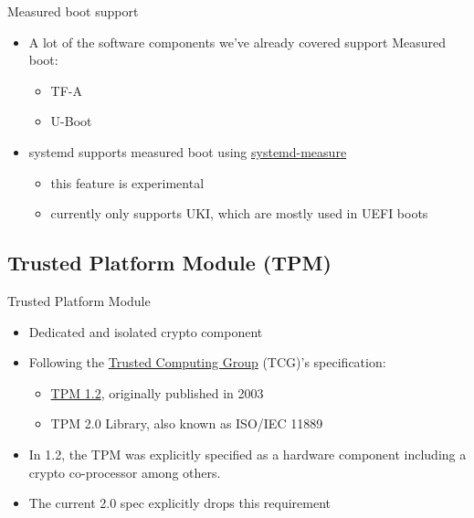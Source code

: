 \begin{frame}{Measured boot support}
  \begin{itemize}
    \item A lot of the software components we've already covered support Measured boot:
    \begin{itemize}
      \item TF-A
      \item U-Boot
    \end{itemize}
    \item systemd supports measured boot using
          \href{https://www.freedesktop.org/software/systemd/man/latest/systemd-measure.html}{systemd-measure}
    \begin{itemize}
      \item this feature is experimental
      \item currently only supports UKI, which are mostly used in UEFI boots
    \end{itemize}
  \end{itemize}
\end{frame}

\subsection{Trusted Platform Module (TPM)}

\begin{frame}{Trusted Platform Module}
  \begin{itemize}
    \item Dedicated and isolated crypto component
    \item Following the \href{https://trustedcomputinggroup.org/}{Trusted Computing Group} (TCG)'s specification:
    \begin{itemize}
        \item \href{https://trustedcomputinggroup.org/resource/tpm-main-specification/}{TPM 1.2}, originally published in 2003
        \item TPM 2.0 Library, also known as ISO/IEC 11889
    \end{itemize}
    \item In 1.2, the TPM was explicitly specified as a hardware component
          including a crypto co-processor among others.
    \item The current 2.0 spec explicitly drops this requirement\\
  \end{itemize}
\end{frame}

